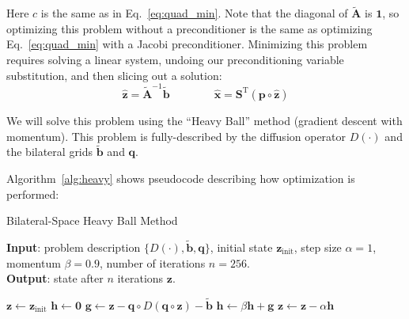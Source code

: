 Here $c$ is the same as in Eq.~\ref{eq:quad_min}. Note that the diagonal of $\tilde{\mathbf{A}}$ is $\mathbf{1}$, so optimizing this problem without a preconditioner is the same as optimizing Eq.~\ref{eq:quad_min} with a Jacobi preconditioner. Minimizing this problem requires solving a linear system, undoing our preconditioning variable substitution, and then slicing out a solution:
\begin{equation*}
\hat{\mathbf{z}} = \tilde{\mathbf{A}}^{-1} \tilde{\mathbf{b}}  \quad  \quad \quad \quad
\mathbf{\hat x} = \mathbf{S}^\mathrm{T}\left( \mathbf{p} \circ \hat{\mathbf{z}}  \right)
\end{equation*}

We will solve this problem using the ``Heavy Ball'' method (gradient descent with momentum).
This problem is fully-described by the diffusion operator $D(\cdot)$ and the bilateral grids $\tilde{\mathbf{b}}$ and $\mathbf{q}$.

Algorithm~\ref{alg:heavy} shows pseudocode describing how optimization is performed:

\begin{algorithm}[h]
\caption{Bilateral-Space Heavy Ball Method \label{alg:heavy}}
\hspace*{\algorithmicindent} \textbf{Input}:
problem description $\{ D(\cdot), \tilde{\mathbf{b}}, \mathbf{q} \}$,
initial state $\mathbf{z}_{\mathrm{init}}$,
step size $\alpha = 1$,
momentum $\beta = 0.9$,
number of iterations $n = 256$. \\
\hspace*{\algorithmicindent} \textbf{Output}:
state after $n$ iterations $\mathbf{z}$. \\
\begin{algorithmic}[1]
\State $\mathbf{z} \gets \mathbf{z}_{\mathrm{init}}$
\State $\mathbf{h} \gets \mathbf{0}$
\State $ \mathbf{g} \gets \mathbf{z} -\mathbf{q} \circ D( \mathbf{q} \circ \mathbf{z} ) - \tilde{\mathbf{b}}$
\State $ \mathbf{h} \gets \beta \mathbf{h} + \mathbf{g}$
\State $ \mathbf{z} \gets \mathbf{z} - \alpha \mathbf{h}$
\EndFor
\end{algorithmic}
\end{algorithm}



